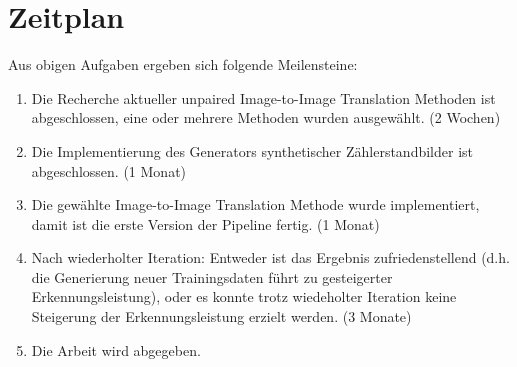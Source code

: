 \chapter*{Zeitplan}
Aus obigen Aufgaben ergeben sich folgende Meilensteine:
\begin{enumerate}
  \item 
  Die Recherche aktueller unpaired Image-to-Image Translation Methoden ist abgeschlossen, eine oder mehrere Methoden wurden ausgewählt.
  (2 Wochen)
  \item
  Die Implementierung des Generators synthetischer Zählerstandbilder ist abgeschlossen.
  (1 Monat)
  \item 
  Die gewählte Image-to-Image Translation Methode wurde implementiert, damit ist die erste Version der Pipeline fertig.
  (1 Monat)
  \item 
  Nach wiederholter Iteration:
Entweder ist das Ergebnis zufriedenstellend (d.h. die Generierung neuer Trainingsdaten führt zu gesteigerter Erkennungsleistung),
oder es konnte trotz wiedeholter Iteration keine Steigerung der Erkennungsleistung erzielt werden.
(3 Monate)
  \item 
  Die Arbeit wird abgegeben.
\end{enumerate}
